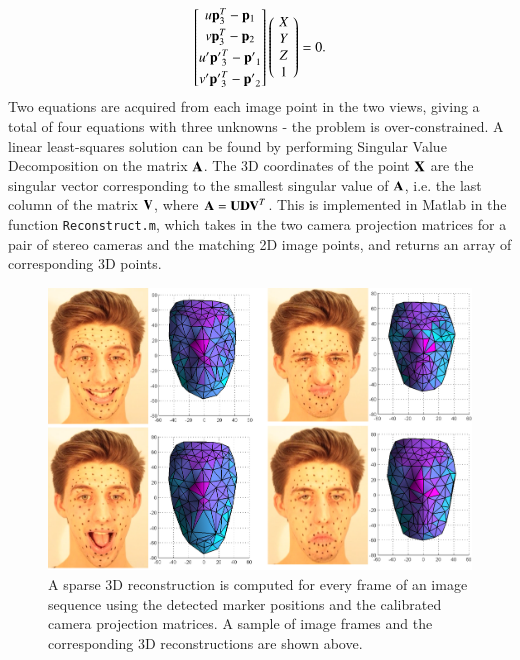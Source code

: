 \begin{equation}
\begin{bmatrix}
       u\mathbf{p}_3^T - \mathbf{p}_1 \\[0.3em]
       v\mathbf{p}_3^T - \mathbf{p}_2 \\[0.3em]
       u' \mathbf{p'}_3^T - \mathbf{p'}_1 \\[0.3em]
       v' \mathbf{p'}_3^T - \mathbf{p'}_2
\end{bmatrix}
\left(\!
    \begin{array}{c}
      X \\
      Y \\
      Z \\
      1
    \end{array}
  	\!\right) = 0.
\end{equation}
Two equations are acquired from each image point in the two views, giving a total of four equations with three unknowns - the problem is over-constrained. A linear least-squares solution can be found by performing Singular Value Decomposition on the matrix $\mathbf{A}$. The 3D coordinates of the point $\mathbf{X}$ are the singular vector corresponding to the smallest singular value of $\mathbf{A}$, i.e. the last column of the matrix $\mathbf{V}$, where $\mathbf{A} = \mathbf{UDV}^T$. This is implemented in Matlab in the function \texttt{Reconstruct.m}, which takes in the two camera projection matrices for a pair of stereo cameras and the matching 2D image points, and returns an array of corresponding 3D points.

\begin{figure}[htbp!]
\centering
\includegraphics[width=\textwidth]{img/faces}
	\caption{A sparse 3D reconstruction is computed for every frame of an image sequence using the detected marker positions and the calibrated camera projection matrices. A sample of image frames and the corresponding 3D reconstructions are shown above.}
	\label{fig:faces}
\end{figure}

